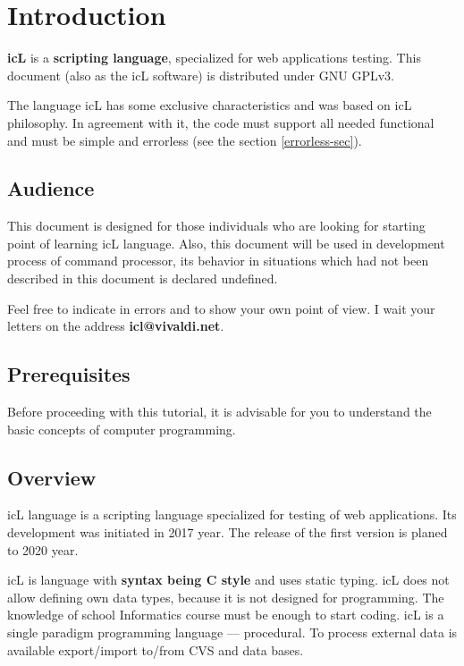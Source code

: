 \section{Introduction}

\indent \textbf{icL} is a \textbf{scripting language}, specialized for web applications testing. This document (also as the icL software) is distributed under GNU GPLv3.

The language icL has some exclusive characteristics and was based on icL philosophy. In agreement with it, the code must support all needed functional and must be simple and errorless (see the section \ref{errorless-sec}).

\subsection{Audience}

This document is designed for those individuals who are looking for starting point of learning icL language. Also, this document will be used in development process of command processor, its behavior in situations which had not been described in this document is declared undefined.

Feel free to indicate in errors and to show your own point of view. I wait your letters on the address {\bf icl@vivaldi.net}.

\subsection{Prerequisites}

Before proceeding with this tutorial, it is advisable for you to understand the basic concepts of computer programming.

\subsection{Overview}

icL language is a scripting language specialized for testing of web applications. Its development was initiated in 2017 year. The release of the first version is planed to 2020 year.

icL is language with \textbf{syntax being C style} and uses static typing. icL does not allow defining own data types, because it is not designed for programming. The knowledge of school Informatics course must be enough to start coding. icL is a single paradigm programming language — procedural. To process external data is available export/import to/from CVS and data bases.

